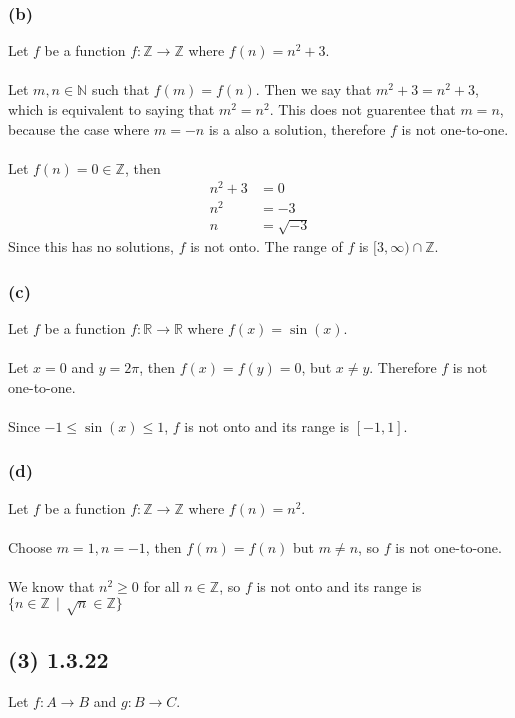 \documentclass{article}
\begin{document}
\subsubsection*{(b)}
Let $f$ be a function $f : \mathbb{Z} \rightarrow \mathbb{Z}$ where $f(n) = n^2 + 3$.
\\\\
Let $m,n \in \mathbb{N}$ such that $f(m) = f(n)$.
Then we say that $m^2 + 3 = n^2 + 3$, which is equivalent to saying that $m^2 = n^2$.
This does not guarentee that $m = n$, because the case where $m = -n$ is a also a solution, therefore $f$ is not one-to-one.
\\\\
Let $f(n) = 0 \in \mathbb{Z}$, then 
\begin{align*}
    n^2 + 3 & = 0 \\
    n^2 & = -3 \\
    n & = \sqrt{-3}
\end{align*}
Since this has no solutions, $f$ is not onto.
The range of $f$ is $[3, \infty) \cap \mathbb{Z}$.
\subsubsection*{(c)}
Let $f$ be a function $f : \mathbb{R} \rightarrow \mathbb{R}$ where $f(x) = \sin(x)$.
\\\\
Let $x = 0$ and $y = 2 \pi$, then $f(x) = f(y) = 0$, but $x \neq y$.
Therefore $f$ is not one-to-one.
\\\\
Since $-1 \leqslant \sin(x) \leqslant 1$, $f$ is not onto and its range is $[-1, 1]$.
\subsubsection*{(d)}
Let $f$ be a function $f : \mathbb{Z} \rightarrow \mathbb{Z}$ where $f(n) = n^2$.
\\\\
Choose $m = 1, n = -1$, then $f(m) = f(n)$ but $m \neq n$, so $f$ is not one-to-one.
\\\\
We know that $n^2 \geqslant 0$ for all $n \in \mathbb{Z}$, so $f$ is not onto and its range is $\{n \in \mathbb{Z} \ \ | \ \ \sqrt{n} \in \mathbb{Z} \}$

\subsection*{(3) 1.3.22}
Let $f: A \rightarrow B$ and $g: B \rightarrow C$.
\end{document}
